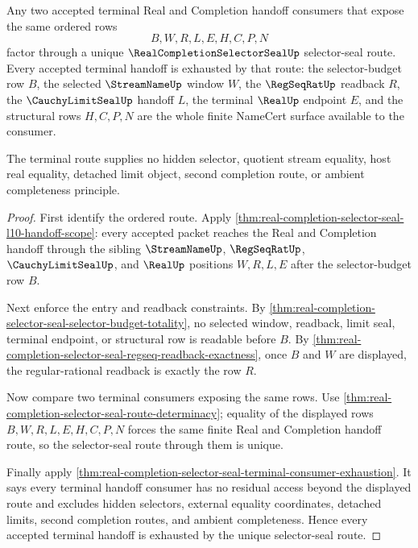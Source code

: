 \begin{theorem}
\label{thm:real-completion-selector-seal-terminality}
Any two accepted terminal Real and Completion handoff consumers that expose the same ordered rows
$$
B,W,R,L,E,H,C,P,N
$$
factor through a unique $\RealCompletionSelectorSealUp$ selector-seal route. Every accepted terminal handoff is exhausted by that route: the selector-budget row $B$, the selected $\StreamNameUp$ window $W$, the $\RegSeqRatUp$ readback $R$, the $\CauchyLimitSealUp$ handoff $L$, the terminal $\RealUp$ endpoint $E$, and the structural rows $H,C,P,N$ are the whole finite NameCert surface available to the consumer.

The terminal route supplies no hidden selector, quotient stream equality, host real equality, detached limit object, second completion route, or ambient completeness principle.
\end{theorem}
\begin{proof}
First identify the ordered route. Apply \autoref{thm:real-completion-selector-seal-l10-handoff-scope}: every accepted packet reaches the Real and Completion handoff through the sibling $\StreamNameUp$, $\RegSeqRatUp$, $\CauchyLimitSealUp$, and $\RealUp$ positions $W,R,L,E$ after the selector-budget row $B$.

Next enforce the entry and readback constraints. By \autoref{thm:real-completion-selector-seal-selector-budget-totality}, no selected window, readback, limit seal, terminal endpoint, or structural row is readable before $B$. By \autoref{thm:real-completion-selector-seal-regseq-readback-exactness}, once $B$ and $W$ are displayed, the regular-rational readback is exactly the row $R$.

Now compare two terminal consumers exposing the same rows. Use \autoref{thm:real-completion-selector-seal-route-determinacy}; equality of the displayed rows $B,W,R,L,E,H,C,P,N$ forces the same finite Real and Completion handoff route, so the selector-seal route through them is unique.

Finally apply \autoref{thm:real-completion-selector-seal-terminal-consumer-exhaustion}. It says every terminal handoff consumer has no residual access beyond the displayed route and excludes hidden selectors, external equality coordinates, detached limits, second completion routes, and ambient completeness. Hence every accepted terminal handoff is exhausted by the unique selector-seal route.
\end{proof}

